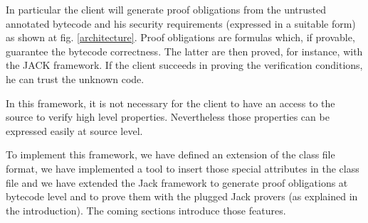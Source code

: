 In particular 
the client will generate proof obligations from the untrusted annotated bytecode and his security requirements 
(expressed in a suitable form)
 as shown at fig. \ref{architecture}. Proof obligations are formulas which, if provable, guarantee the bytecode correctness.
The latter are then proved, for instance, with the JACK framework. If the client succeeds in proving 
the verification conditions, he can trust the unknown code. 

In this framework, it is not necessary for the client to have an access to the source to verify high level properties. 
Nevertheless those properties can be expressed easily at source level.

To implement this framework, we have defined an extension of the class file format, we have implemented a tool to insert 
those special attributes in the class file and we have extended the Jack framework to generate proof obligations at bytecode 
level and to prove them with the plugged Jack provers (as explained in the introduction). 
The coming sections introduce those features.  

